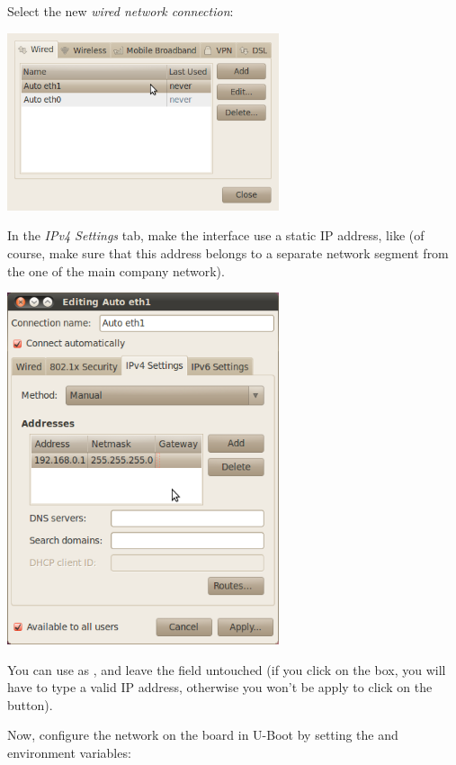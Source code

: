 Select the new {\em wired network connection}:

\begin{center}
\includegraphics[width=8cm]{labs/sysdev-u-boot/network-config-2.png}
\end{center}

In the {\em IPv4 Settings} tab, make the interface use a static IP
address, like  (of course, make sure that this
address belongs to a separate network segment from the one of the main
company network).

\begin{center}
\includegraphics[width=8cm]{labs/sysdev-u-boot/network-config-3.png}
\end{center}

You can use  as , and leave the
 field untouched (if you click on the  box, you
will have to type a valid IP address, otherwise you won't be apply to
click on the  button).

Now, configure the network on the board in U-Boot by setting the 
and  environment variables:

